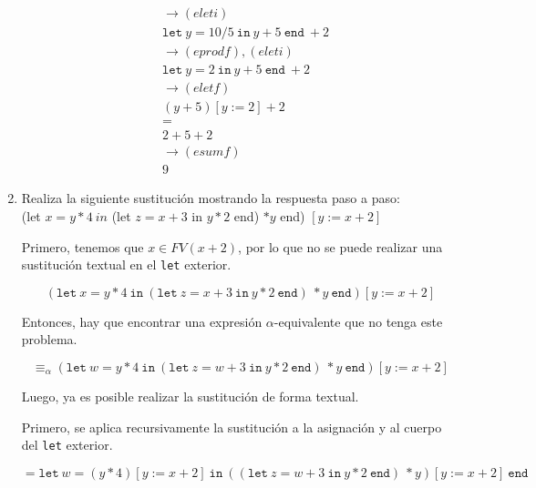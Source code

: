\documentclass{article}
\begin{document}
\begin{enumerate}
{\begin{enumerate}
{\begin{align*}
        	&\rightarrow (eleti) \\
        	&\texttt{let} \ y = 10 / 5 \ \texttt{in} \ y + 5\ \texttt{end} \  + 2 \\
        	&\rightarrow (eprodf), (eleti) \\
        	&\texttt{let} \ y = 2 \ \texttt{in} \ y + 5\ \texttt{end} \  + 2 \\
        	&\rightarrow (eletf) \\
        	&(y+5)[y:=2] + 2 \\
        	&= \\
        	& 2 + 5 + 2 \\
        	&\rightarrow (esumf) \\
        	& 9
        	\end{align*}
        	
        	}
            \end{enumerate}
        }
    	\item {
    	Realiza la siguiente sustitución mostrando la respuesta paso a paso:\\
    	
    	(let  $x = y \ast 4 \ in$ (let $z = x + 3$  in  $y \ast 2$ end) $\ast y $ end) $[y := x + 2]$
    	
    	Primero, tenemos que $x \in FV(x + 2)$, por lo que no se puede realizar
    	una sustitución textual en el \texttt{let} exterior.
    	
    	\[
    	(\texttt{let} \ x = y \ast 4 \ \texttt{in} \ 
    	(\texttt{let} \ z = x + 3 \ \texttt{in} \ 
    	y \ast 2 \ \texttt{end}) \ \ast y \ \texttt{end}) 
    	[y := x + 2]
    	\]
    	
    	Entonces, hay que encontrar una expresión $\alpha$-equivalente que no
    	tenga este problema.
    	
    	\[
    	\equiv_{\alpha}
    	(\texttt{let} \ w = y \ast 4 \ \texttt{in} \ 
    	(\texttt{let} \ z = w + 3 \ \texttt{in} \ 
    	y \ast 2 \ \texttt{end}) \ \ast y \ \texttt{end}) 
    	[y := x + 2]
    	\]
    	
    	Luego, ya es posible realizar la sustitución de forma textual.
    	
    	Primero, se aplica recursivamente la sustitución a la asignación y al
    	cuerpo del \texttt{let} exterior.
    	
    	\[
    	=
    	\texttt{let} \ w = (y \ast 4)[y := x + 2] \ \texttt{in} \ 
    	((\texttt{let} \ z = w + 3 \ \texttt{in} \ 
    	y \ast 2 \ \texttt{end}) \ \ast y) [y := x + 2] \ \texttt{end}
    	\]
    	
}
\end{enumerate}
\end{document}
